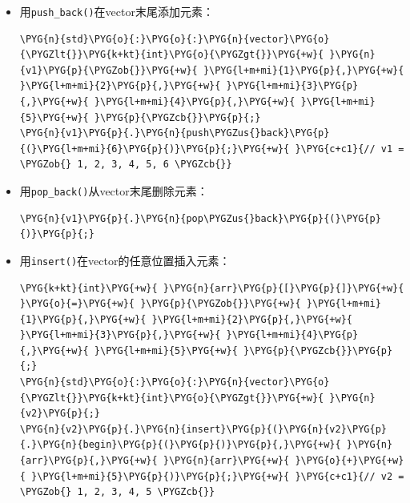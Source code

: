 \begin{itemize}
\item 用\texttt{push\_\allowbreak{}back()}在vector末尾添加元素：



\begin{codeblockbg}
\begin{Verbatim}[commandchars=\\\{\},breaklines=true,breakanywhere=true,fontsize=\codefont,xleftmargin=17bp]
\PYG{n}{std}\PYG{o}{:}\PYG{o}{:}\PYG{n}{vector}\PYG{o}{\PYGZlt{}}\PYG{k+kt}{int}\PYG{o}{\PYGZgt{}}\PYG{+w}{ }\PYG{n}{v1}\PYG{p}{\PYGZob{}}\PYG{+w}{ }\PYG{l+m+mi}{1}\PYG{p}{,}\PYG{+w}{ }\PYG{l+m+mi}{2}\PYG{p}{,}\PYG{+w}{ }\PYG{l+m+mi}{3}\PYG{p}{,}\PYG{+w}{ }\PYG{l+m+mi}{4}\PYG{p}{,}\PYG{+w}{ }\PYG{l+m+mi}{5}\PYG{+w}{ }\PYG{p}{\PYGZcb{}}\PYG{p}{;}
\PYG{n}{v1}\PYG{p}{.}\PYG{n}{push\PYGZus{}back}\PYG{p}{(}\PYG{l+m+mi}{6}\PYG{p}{)}\PYG{p}{;}\PYG{+w}{ }\PYG{c+c1}{// v1 = \PYGZob{} 1, 2, 3, 4, 5, 6 \PYGZcb{}}
\end{Verbatim}
\end{codeblockbg}



\item 用\texttt{pop\_\allowbreak{}back()}从vector末尾删除元素：



\begin{codeblockbg}
\begin{Verbatim}[commandchars=\\\{\},breaklines=true,breakanywhere=true,fontsize=\codefont,xleftmargin=17bp]
\PYG{n}{v1}\PYG{p}{.}\PYG{n}{pop\PYGZus{}back}\PYG{p}{(}\PYG{p}{)}\PYG{p}{;}
\end{Verbatim}
\end{codeblockbg}



\item 用\texttt{insert()}在vector的任意位置插入元素：



\begin{codeblockbg}
\begin{Verbatim}[commandchars=\\\{\},breaklines=true,breakanywhere=true,fontsize=\codefont,xleftmargin=17bp]
\PYG{k+kt}{int}\PYG{+w}{ }\PYG{n}{arr}\PYG{p}{[}\PYG{p}{]}\PYG{+w}{ }\PYG{o}{=}\PYG{+w}{ }\PYG{p}{\PYGZob{}}\PYG{+w}{ }\PYG{l+m+mi}{1}\PYG{p}{,}\PYG{+w}{ }\PYG{l+m+mi}{2}\PYG{p}{,}\PYG{+w}{ }\PYG{l+m+mi}{3}\PYG{p}{,}\PYG{+w}{ }\PYG{l+m+mi}{4}\PYG{p}{,}\PYG{+w}{ }\PYG{l+m+mi}{5}\PYG{+w}{ }\PYG{p}{\PYGZcb{}}\PYG{p}{;}
\PYG{n}{std}\PYG{o}{:}\PYG{o}{:}\PYG{n}{vector}\PYG{o}{\PYGZlt{}}\PYG{k+kt}{int}\PYG{o}{\PYGZgt{}}\PYG{+w}{ }\PYG{n}{v2}\PYG{p}{;}
\PYG{n}{v2}\PYG{p}{.}\PYG{n}{insert}\PYG{p}{(}\PYG{n}{v2}\PYG{p}{.}\PYG{n}{begin}\PYG{p}{(}\PYG{p}{)}\PYG{p}{,}\PYG{+w}{ }\PYG{n}{arr}\PYG{p}{,}\PYG{+w}{ }\PYG{n}{arr}\PYG{+w}{ }\PYG{o}{+}\PYG{+w}{ }\PYG{l+m+mi}{5}\PYG{p}{)}\PYG{p}{;}\PYG{+w}{ }\PYG{c+c1}{// v2 = \PYGZob{} 1, 2, 3, 4, 5 \PYGZcb{}}
\end{Verbatim}
\end{codeblockbg}



\end{itemize}
